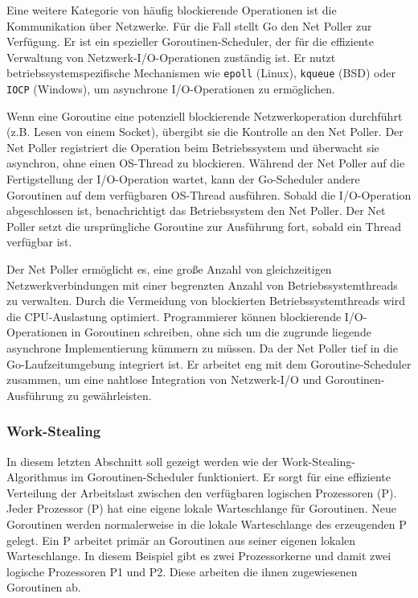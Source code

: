 \documentclass[fontsize=12pt,paper=a4,twoside=semi,parskip=half-,headsepline,headinclude]{scrreprt}
\begin{document}
Eine weitere Kategorie von häufig blockierende Operationen ist die Kommunikation über Netzwerke. Für die Fall stellt Go den Net Poller zur Verfügung. Er ist ein spezieller Goroutinen-Scheduler, der für die effiziente Verwaltung von Netzwerk-I/O-Operationen zuständig ist. Er nutzt betriebssystemspezifische Mechanismen wie \texttt{epoll} (Linux), \texttt{kqueue} (BSD) oder \texttt{IOCP} (Windows), um asynchrone I/O-Operationen zu ermöglichen.

Wenn eine Goroutine eine potenziell blockierende Netzwerkoperation durchführt (z.B. Lesen von einem Socket), übergibt sie die Kontrolle an den Net Poller. Der Net Poller registriert die Operation beim Betriebssystem und überwacht sie asynchron, ohne einen OS-Thread zu blockieren. Während der Net Poller auf die Fertigstellung der I/O-Operation wartet, kann der Go-Scheduler andere Goroutinen auf dem verfügbaren OS-Thread ausführen. Sobald die I/O-Operation abgeschlossen ist, benachrichtigt das Betriebssystem den Net Poller. Der Net Poller setzt die ursprüngliche Goroutine zur Ausführung fort, sobald ein Thread verfügbar ist.

Der Net Poller ermöglicht es, eine große Anzahl von gleichzeitigen Netzwerkverbindungen mit einer begrenzten Anzahl von Betriebssystemthreads zu verwalten. Durch die Vermeidung von blockierten Betriebssystemthreads wird die CPU-Auslastung optimiert. Programmierer können blockierende I/O-Operationen in Goroutinen schreiben, ohne sich um die zugrunde liegende asynchrone Implementierung kümmern zu müssen. Da der Net Poller tief in die Go-Laufzeitumgebung integriert ist. Er arbeitet eng mit dem Goroutine-Scheduler zusammen, um eine nahtlose Integration von Netzwerk-I/O und Goroutinen-Ausführung zu gewährleisten. 

\subsubsection{Work-Stealing}

In diesem letzten Abschnitt soll gezeigt werden wie der Work-Stealing-Algorithmus im Goroutinen-Scheduler funktioniert. Er sorgt für eine effiziente Verteilung der Arbeitslast zwischen den verfügbaren logischen Prozessoren (P). Jeder Prozessor (P) hat eine eigene lokale Warteschlange für Goroutinen. Neue Goroutinen werden normalerweise in die lokale Warteschlange des erzeugenden P gelegt. Ein P arbeitet primär an Goroutinen aus seiner eigenen lokalen Warteschlange. In diesem Beispiel gibt es zwei Prozessorkerne und damit zwei logische Prozessoren P1 und P2. Diese arbeiten die ihnen zugewiesenen Goroutinen ab.
\end{document}
